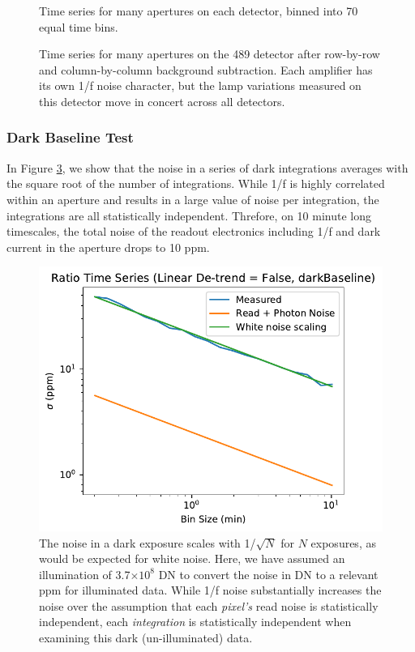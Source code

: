 \documentclass{aastex62}
\begin{document}
\begin{figure}
{}
{}
{}
\caption{Time series for many apertures on each detector, binned into 70 equal time bins.}\label{fig:manyApPerDetector}
\end{figure}

\begin{figure}
{}
{}
\caption{Time series for many apertures on the 489 detector after row-by-row and column-by-column background subtraction.
Each amplifier has its own 1/f noise character, but the lamp variations measured on this detector move in concert across all detectors.}\label{fig:manyApOn489}
\end{figure}



\clearpage
\subsubsection{Dark Baseline Test}\label{sec:darkBaseline}
In Figure \ref{fig:darkBaselineAllan}, we show that the noise in a series of dark integrations averages with the square root of the number of integrations.
While 1/f is highly correlated within an aperture and results in a large value of noise per integration, the integrations are all statistically independent. Threfore, on 10 minute long timescales, the total noise of the readout electronics including 1/f and dark current in the aperture drops to 10 ppm.

\begin{figure}[!hbtp]
\centering
\includegraphics[width=.4\columnwidth]{allan_var_removelinear_False_darkBaseline.pdf}
\caption{The noise in a dark exposure scales with 1/$\sqrt{N}$ for $N$ exposures, as would be expected for white noise.
Here, we have assumed an illumination of 3.7$\times10^8$ DN to convert the noise in DN to a relevant ppm for illuminated data.
While 1/f noise substantially increases the noise over the assumption that each \textit{pixel's} read noise is statistically independent, each \textit{integration} is statistically independent when examining this dark (un-illuminated) data.
}\label{fig:darkBaselineAllan}
\end{figure}
\end{document}
